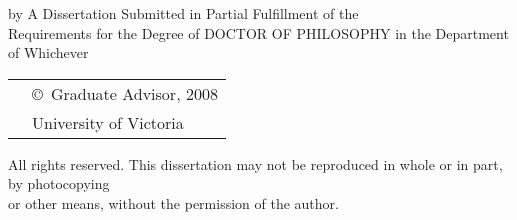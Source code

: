 \pagebreak
{
\centering
\thesistitle
\tpbreak
by
\tpbreak
\nameanddegrees
\tpbreak
A Dissertation Submitted in Partial Fulfillment of the \\
Requirements for the Degree of
\tpbreak
DOCTOR OF PHILOSOPHY
\tpbreak
in the Department of Whichever\\
\vfill
\begin{tabular}{cl}
& \copyright\ Graduate Advisor, 2008\\
& \phantom{\copyright} University of Victoria
\end{tabular}
\tpbreak
All rights reserved. This dissertation may not be reproduced in whole or in part, by photocopying\\
\hfill or other means, without the permission of the author. \hfill
}
\pagebreak
